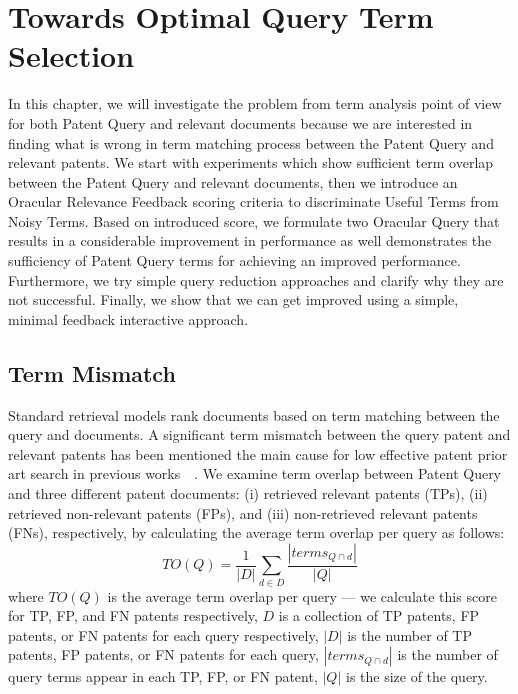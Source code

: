 \chapter{Towards Optimal Query Term Selection}
\label{cha:analysis}
In this chapter, we will investigate the problem from term analysis point of 
view for both Patent Query and relevant documents because we are interested 
in finding what is wrong in term matching process between the Patent Query and relevant patents. 
We start with experiments which show sufficient term overlap between the Patent Query and relevant documents, 
then we introduce an Oracular Relevance Feedback scoring criteria to discriminate Useful Terms from Noisy Terms. 
Based on introduced score, we formulate two Oracular Query that results in a considerable improvement 
in performance as well demonstrates the sufficiency of Patent Query terms for achieving an improved performance. 
Furthermore, we try simple query reduction approaches and clarify why they are not successful.  
Finally, we show that we can get improved using a simple, minimal feedback interactive approach.

\section{Term Mismatch}
\label{sec:termmismatch}
%
Standard retrieval models rank documents based on term matching between the query and documents.  
A significant term mismatch between the query patent and relevant patents has been mentioned the
main cause for low effective patent prior art search in previous works~\citep{roda2010clef}~\citep{magdy2012toward}. 
We examine term overlap between Patent Query and three different patent documents: (i) retrieved relevant patents (TPs), (ii) retrieved non-relevant patents (FPs), and (iii) non-retrieved relevant patents (FNs), respectively, by calculating the average term overlap per query as follows:
\begin{equation} 
TO (Q) = \frac{1}{|D|}\sum_{d\in D}\frac{|terms_{Q\cap d}|}{|Q|}
\label{eq:fntermoverlap}
\end{equation}
where $TO(Q)$ is the average term overlap per query --- we calculate this score for TP, FP, and FN patents respectively, $D$ is a collection of TP patents, FP patents, or FN patents for each query respectively, $|D|$ is the number of TP patents, FP patents, or FN patents for each query, $ |terms_{Q\cap d}| $ is the number of query terms appear in each TP, FP, or FN patent, $ |Q| $ is the size of the query.

